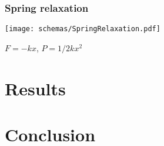 \documentclass{beamer}
\begin{document}
\begin{frame}
    \frametitle{Spring relaxation}
    \begin{center}
    \texttt{[image: schemas/SpringRelaxation.pdf]}
    \end{center}
    
    $F=-kx$, $P = 1/2 k x^2$
\end{frame}

\section{Results}
\section{Conclusion}
\end{document}
